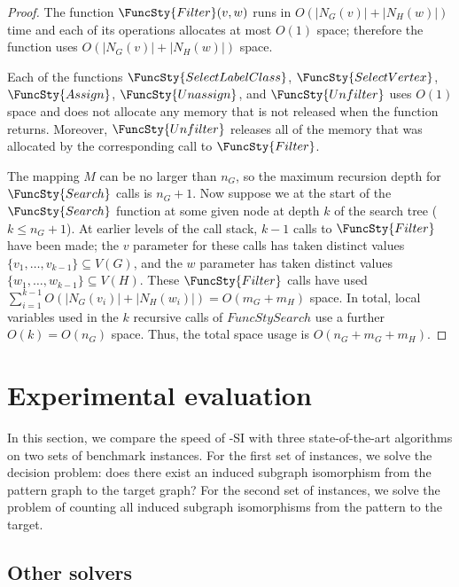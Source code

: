 \begin{proof}
    The function $\FuncSty{Filter}(v,w)$ runs in $O(|N_G(v)| + |N_H(w)|)$ time
    and each of its operations allocates at most $O(1)$ space; therefore the
    function uses $O(|N_G(v)| + |N_H(w)|)$ space.

    Each of the functions
    $\FuncSty{SelectLabelClass}$,
    $\FuncSty{SelectVertex}$,
    $\FuncSty{Assign}$,
    $\FuncSty{Unassign}$,
    and
    $\FuncSty{Unfilter}$
    uses $O(1)$ space and does not allocate any memory that is not released
    when the function returns.  Moreover, $\FuncSty{Unfilter}$ releases
    all of the memory that was allocated by the corresponding call to $\FuncSty{Filter}$.

    The mapping $M$ can be no larger than $n_G$, so the maximum recursion depth for
    $\FuncSty{Search}$ calls is $n_G + 1$.  Now suppose we at the start of the
    $\FuncSty{Search}$ function at some given node at depth $k$ of the search tree 
    ($k \leq n_G + 1$).  At earlier levels of the call stack, $k-1$ calls to $\FuncSty{Filter}$
    have been made; the $v$ parameter for these calls has taken distinct values
    $\{v_1, \dots, v_{k-1}\} \subseteq V(G)$, and the $w$ parameter has taken distinct values
    $\{w_1, \dots, w_{k-1}\} \subseteq V(H)$.  These $\FuncSty{Filter}$ calls have used
    $\sum_{i=1}^{k-1} O(|N_G(v_i)| + |N_H(w_i)|) = O(m_G + m_H)$ space.  In total,
    local variables used in the $k$
    recursive calls of $FuncSty{Search}$ use a further $O(k) = O(n_G)$ space.  Thus,
    the total space usage is $O(n_G + m_G + m_H)$.
\end{proof}

\section{Experimental evaluation}

In this section, we compare the speed of \McSplit-SI with three state-of-the-art algorithms
on two sets of benchmark instances.  For the first set of instances, we solve the decision problem:
does there exist an induced subgraph isomorphism from the pattern graph to the target
graph?  For the second set of instances, we solve the problem of counting all induced subgraph
isomorphisms from the pattern to the target.

\subsection{Other solvers}

